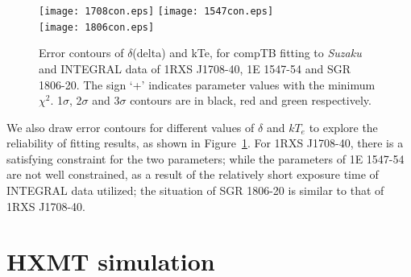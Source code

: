 \documentclass[]{raa}
\begin{document}
\begin{figure}
   \texttt{[image: 1708con.eps]}
   \texttt{[image: 1547con.eps]}\\
   \texttt{[image: 1806con.eps]}

   \caption{Error contours of $\delta$(delta) and kTe, for compTB fitting to {\it Suzaku} and INTEGRAL data of 1RXS J1708-40, 1E 1547-54 and SGR 1806-20. The sign `+' indicates parameter values with the minimum $\chi^2$. 1$\sigma$, 2$\sigma$ and 3$\sigma$ contours are in black, red and green respectively.} 
   \label{con}
   \end{figure}

We also draw error contours for different values of $\delta$ and $kT_e$ to explore the reliability of fitting results, as shown in Figure~\ref{con}.
%
For 1RXS J1708-40, there is a satisfying constraint for the two parameters; while the parameters of 1E 1547-54 are not well constrained, as a result of the relatively short exposure time of INTEGRAL data utilized; the situation of SGR 1806-20 is similar to that of 1RXS J1708-40.

%
%
%
%
%
%


\section{HXMT simulation}
\end{document}

